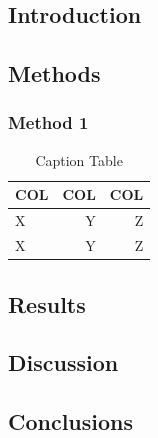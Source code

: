 \subsection{Introduction}

\subsection{Methods}
\subsubsection{Method 1}
\lipsum[1-2] \cite{smith2019title}


\begin{table}[h]
\centering
 \caption{Caption Table \label{CH2T01}}
 \begin{tabular}{lrr}
    \hline
    COL & COL & COL\\
    \hline
    X & Y & Z \\
    X & Y & Z \\
    \hline
  \end{tabular}
\end{table}

\subsection{Results}
\lipsum[4-5]

\subsection{Discussion}
\lipsum[6]
\subsection{Conclusions}
\lipsum[7]